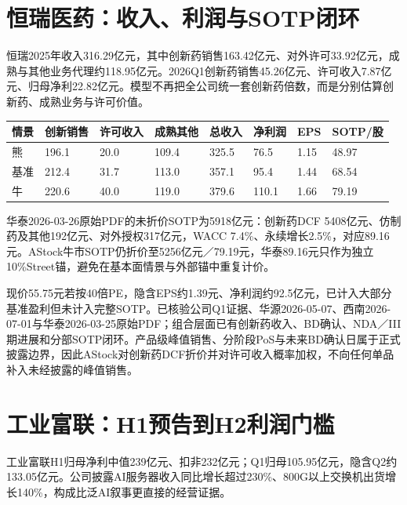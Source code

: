\section{恒瑞医药：收入、利润与SOTP闭环}

恒瑞2025年收入316.29亿元，其中创新药销售163.42亿元、对外许可33.92亿元，成熟与其他业务代理约118.95亿元。2026Q1创新药销售45.26亿元、许可收入7.87亿元、归母净利22.82亿元。模型不再把全公司统一套创新药倍数，而是分别估算创新药、成熟业务与许可价值。

\begin{exhibitbox}
\begin{tabularx}{\textwidth}{L{1.4cm}R{1.35cm}R{1.35cm}R{1.35cm}R{1.25cm}R{1.25cm}R{1.25cm}X}
\toprule
\textbf{情景} & \textbf{创新销售} & \textbf{许可收入} & \textbf{成熟其他} & \textbf{总收入} & \textbf{净利润} & \textbf{EPS} & \textbf{SOTP/股} \\
\midrule
熊 & 196.1 & 20.0 & 109.4 & 325.5 & 76.5 & 1.15 & 48.97 \\
基准 & 212.4 & 31.7 & 113.0 & 357.1 & 95.4 & 1.44 & 68.54 \\
牛 & 220.6 & 40.0 & 119.0 & 379.6 & 110.1 & 1.66 & 79.19 \\
\bottomrule
\end{tabularx}
\end{exhibitbox}

华泰2026-03-26原始PDF的未折价SOTP为5918亿元：创新药DCF 5408亿元、仿制药及其他192亿元、对外授权317亿元，WACC 7.4\%、永续增长2.5\%，对应89.16元。AStock牛市SOTP仍折价至5256亿元／79.19元，华泰89.16元只作为独立10\%Street锚，避免在基本面情景与外部锚中重复计价。

现价55.75元若按40倍PE，隐含EPS约1.39元、净利润约92.5亿元，已计入大部分基准盈利但未计入完整SOTP。已核验公司Q1证据、华源2026-05-07、西南2026-07-01与华泰2026-03-25原始PDF；组合层面已有创新药收入、BD确认、NDA／III期进展和分部SOTP闭环。产品级峰值销售、分阶段PoS与未来BD确认日属于正式披露边界，因此AStock对创新药DCF折价并对许可收入概率加权，不向任何单品补入未经披露的峰值销售。

\section{工业富联：H1预告到H2利润门槛}

工业富联H1归母净利中值239亿元、扣非232亿元；Q1归母105.95亿元，隐含Q2约133.05亿元。公司披露AI服务器收入同比增长超过230\%、800G以上交换机出货增长140\%，构成比泛AI叙事更直接的经营证据。

